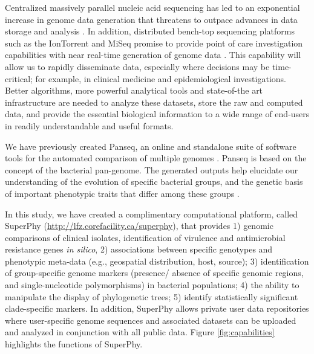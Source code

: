 \documentclass[a4paper,twoside]{article}
\begin{document}
\noindent Centralized massively parallel nucleic acid sequencing has led to an exponential increase in genome data generation that threatens to outpace advances in data storage and analysis \cite{kahn_future_2011,teeling_current_2012}. In addition, distributed bench-top sequencing platforms such as the IonTorrent and MiSeq promise to provide point of care investigation capabilities with near real-time generation of genome data \cite{loman_performance_2012}. This capability will allow us to rapidly disseminate data, especially where decisions may be time-critical; for example, in clinical medicine and epidemiological investigations. Better algorithms, more powerful analytical tools and state-of-the art infrastructure are needed to analyze these datasets, store the raw and computed data, and provide the essential biological information to a wide range of end-users in readily understandable and useful formats.

We have previously created Panseq, an online and standalone suite of software tools for the automated comparison of multiple genomes \cite{laing_pan-genome_2010,laing_identification_2011}. Panseq is based on the concept of the bacterial pan-genome. The generated outputs help elucidate our understanding of the evolution of specific bacterial groups, and the genetic basis of important phenotypic traits that differ among these groups \cite{laing_pan-genome_2010}.

In this study, we have created a complimentary computational platform, called SuperPhy (\url{http://lfz.corefacility.ca/superphy}), that provides 1) genomic comparisons of clinical isolates, identification of virulence and antimicrobial resistance genes \textit{in silico}, 2) associations between specific genotypes and phenotypic meta-data (e.g., geospatial distribution, host, source); 3) identification of group-specific genome markers (presence/ absence of specific genomic regions, and single-nucleotide polymorphisms) in bacterial populations; 4) the ability to manipulate the display of phylogenetic trees; 5) identify statistically significant clade-specific markers. In addition, SuperPhy allows private user data repositories where user-specific genome sequences and associated datasets can be uploaded and analyzed in conjunction with all public data. Figure \ref{fig:capabilities} highlights the functions of SuperPhy.
\end{document}
